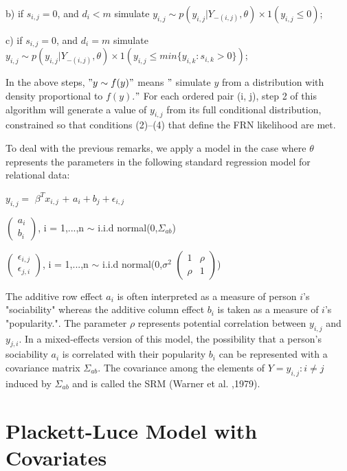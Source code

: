 \documentclass[12pt]{ociamthesis}  %
\begin{document}
	b)  if $s_{i,j} = 0$, and $d_{i} < m$ simulate $y_{i,j} \sim p(y_{i,j}| Y_{-(i,j)}, \theta) \times 1(y_{i,j} \leq 0)$;
	
	c) if $s_{i,j} = 0$, and $d_{i} = m$ simulate $y_{i,j} \sim p(y_{i,j}| Y_{-(i,j)}, \theta) \times 1(y_{i,j} \leq min \{ y_{i,k} : s_{i,k} > 0 \})$;
	
	In the above steps, $"y \sim f(y)"$ means $"$ simulate $y$ from a distribution with density proportional
	to $f(y)$.$ " $ For each ordered pair (i, j), step 2 of this algorithm will generate a value of $y_{i,j}$ from
	its full conditional distribution, constrained so that conditions (2)–(4) that define the FRN likelihood are met.
	
	To deal with the previous remarks, we apply a model in the case where $\theta$  represents the parameters in the following standard regression model for relational data:
	
	$y_{i,j} = $ \boldmath $\beta^{T} {x_{i,j}}$ \unboldmath + $a_{i} + b_{j} + \epsilon_{i,j}$
	
	\(
	\begin{pmatrix}
	a_{i} \\
	b_{i}
	\end{pmatrix}
	\), i = 1,...,n $\sim $ i.i.d normal(0,$\Sigma_{ab}$)
	
	\(
	\begin{pmatrix}
	\epsilon_{i,j} \\
	\epsilon_{j,i}
	\end{pmatrix}
	\), i = 1,...,n $\sim $ i.i.d normal(0,$\sigma^{2}$ $\begin{pmatrix} 1 & \rho \\ \rho & 1 \end{pmatrix}$)
	
	The additive row effect $a_{i}$ is often interpreted as a measure of person $i$’s "sociability" whereas the additive column effect $b_{i}$ is taken as a measure of $i$’s "popularity.". The parameter $\rho$ represents potential correlation between $y_{i,j} $ and $y_{j,i}$. In a mixed-effects version
	of this model, the possibility that a person’s sociability $a_{i}$ is correlated with their popularity $b_{i}$ can be represented with a covariance matrix $\Sigma_{ab}$. The covariance among the elements of $Y = {y_{i,j} : i \neq j}$ induced by $\Sigma_{ab}$ and is called the SRM (Warner et al. ,1979).
	
	\section{Plackett-Luce Model with Covariates}
	
\end{document}
